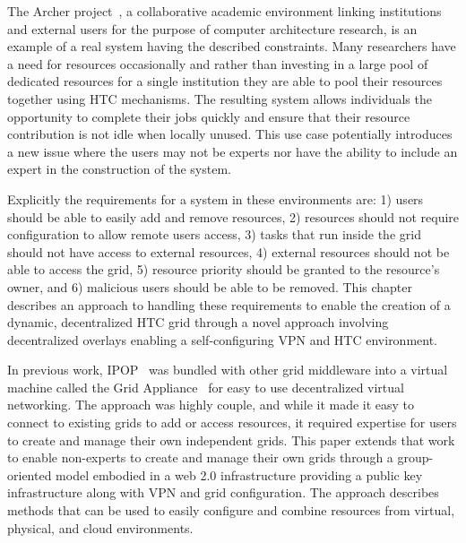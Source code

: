 The Archer project~\cite{archer}, a collaborative academic environment
linking institutions and external users for the purpose of computer architecture
research, is an example of a real system having the described constraints.  Many
researchers have a need for resources occasionally and rather than investing
in a large pool of dedicated resources for a single institution they are able
to pool their resources together using HTC mechanisms.  The resulting system
allows individuals the opportunity to complete their jobs quickly and ensure
that their resource contribution is not idle when locally unused.  This use
case potentially introduces a new issue where the users may not be experts nor
have the ability to include an expert in the construction of the system.

Explicitly the requirements for a system in these environments are: 1) users
should be able to easily add and remove resources, 2) resources should not
require configuration to allow remote users access, 3) tasks that run inside
the grid should not have access to external resources, 4) external resources
should not be able to access the grid, 5) resource priority should be granted
to the resource's owner, and 6) malicious users should be able to be removed.
This chapter describes an approach to handling these requirements to
enable the creation of a dynamic, decentralized HTC grid through a novel
approach involving decentralized overlays enabling a self-configuring VPN
and HTC environment.  

In previous work, IPOP~\cite{ipop} was bundled with other grid middleware
into a virtual machine called the Grid Appliance~\cite{grid_appliance} for
easy to use decentralized virtual networking.  The approach was highly couple,
and while it made it easy to connect to existing grids to add or access
resources, it required expertise for users to create and manage their own
independent grids.  This paper extends that work to enable non-experts to
create and manage their own grids through a group-oriented model embodied in a
web 2.0 infrastructure providing a public key infrastructure along with VPN and
grid configuration.  The approach describes methods that can be used to easily
configure and combine resources from virtual, physical, and cloud
environments.


